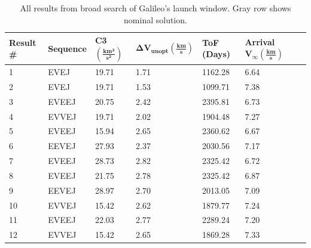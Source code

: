 \documentclass[letterpaper, preprint, paper,11pt]{AAS}	%
\begin{document}
\begin{table}[h!]
    \centering
    \caption{All results from broad search of Galileo's launch window. Gray row shows nominal solution.}
    \begin{tabular}{lllllll}
    \toprule
    \textbf{Result \#} & \textbf{Sequence}   & \textbf{C3} $\boldsymbol{(\frac{km^2}{s^2})}$    & $\boldsymbol{\Delta V_{unopt} (\frac{km}{s})}$  & \textbf{ToF (Days) }           & \textbf{Arrival} $\boldsymbol{V_\infty (\frac{km}{s})}$          \\
    \midrule
    1         & EVEJ  & 19.71 & 1.71 & 1162.28        & 6.64 \\
    2         & EVEJ  & 19.71 & 1.53 & 1099.71        & 7.38 \\
    3         & EVEEJ & 20.75 & 2.42 & 2395.81        & 6.73 \\
    4         & EVVEJ & 19.71 & 2.02 & 1904.48        & 7.27 \\
    5         & EVEEJ & 15.94 & 2.65 & 2360.62        & 6.67 \\
    6         & EEVEJ & 27.93 & 2.37 & 2030.56        & 7.17 \\
    7         & EVEEJ & 28.73 & 2.82 & 2325.42        & 6.72 \\
    \rowcolor{lightgray}8         & EVEEJ & 21.75 & 2.78 & 2325.42        & 6.87 \\
    9         & EEVEJ & 28.97 & 2.70 & 2013.05        & 7.09 \\
    10         & EVVEJ & 15.42 & 2.62 & 1879.77        & 7.24 \\
    11        & EVEEJ & 22.03 & 2.77 & 2289.24        & 7.20 \\
    12        & EVVEJ & 15.42 & 2.65 & 1869.28        & 7.33 \\
    \bottomrule
    \end{tabular}
\end{table}
\end{document}
